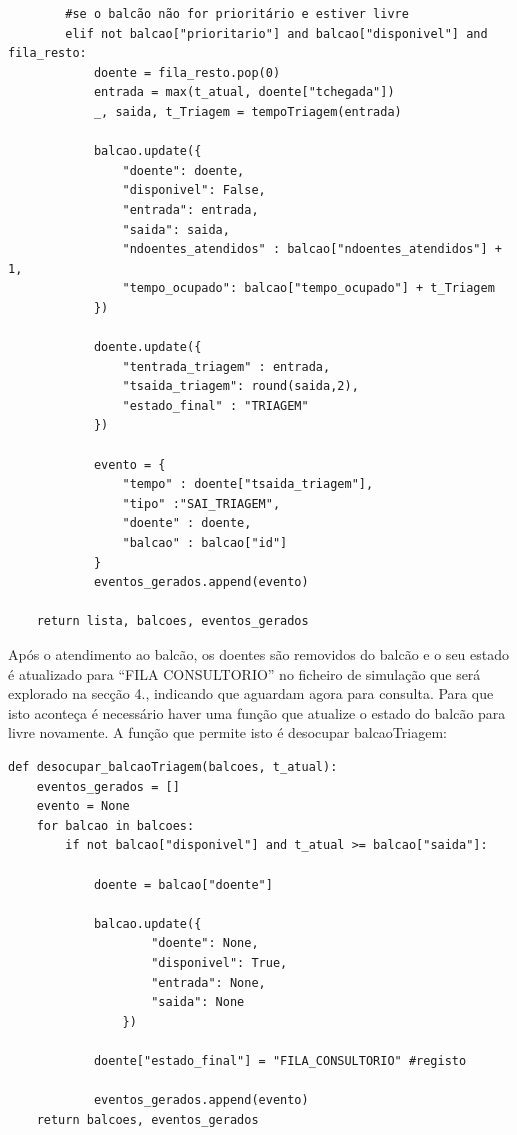 \documentclass[12pt,a4paper]{article} %
\begin{document}
\begin{verbatim}
        #se o balcão não for prioritário e estiver livre 
        elif not balcao["prioritario"] and balcao["disponivel"] and fila_resto:
            doente = fila_resto.pop(0)
            entrada = max(t_atual, doente["tchegada"])
            _, saida, t_Triagem = tempoTriagem(entrada)

            balcao.update({
                "doente": doente,
                "disponivel": False,
                "entrada": entrada,
                "saida": saida,
                "ndoentes_atendidos" : balcao["ndoentes_atendidos"] + 1,
                "tempo_ocupado": balcao["tempo_ocupado"] + t_Triagem
            })

            doente.update({
                "tentrada_triagem" : entrada,
                "tsaida_triagem": round(saida,2),
                "estado_final" : "TRIAGEM"
            })

            evento = {
                "tempo" : doente["tsaida_triagem"],
                "tipo" :"SAI_TRIAGEM",
                "doente" : doente,
                "balcao" : balcao["id"]
            }
            eventos_gerados.append(evento)

    return lista, balcoes, eventos_gerados
\end{verbatim}

    \medskip
    Após o atendimento ao balcão, os doentes são removidos do balcão e o seu estado é atualizado para “FILA CONSULTORIO” no ficheiro de simulação que será explorado na secção 4., indicando que aguardam agora para consulta. Para que isto aconteça é necessário haver uma função que atualize o estado do balcão para livre novamente. A função que permite isto é desocupar balcaoTriagem:

\hypertarget{desocupa_balcao}{}
\begin{verbatim}
def desocupar_balcaoTriagem(balcoes, t_atual):
    eventos_gerados = [] 
    evento = None
    for balcao in balcoes:
        if not balcao["disponivel"] and t_atual >= balcao["saida"]:

            doente = balcao["doente"]
        
            balcao.update({
                    "doente": None,
                    "disponivel": True,
                    "entrada": None,
                    "saida": None
                })
            
            doente["estado_final"] = "FILA_CONSULTORIO" #registo

            eventos_gerados.append(evento)
    return balcoes, eventos_gerados  
\end{verbatim} 
    
\end{document}
